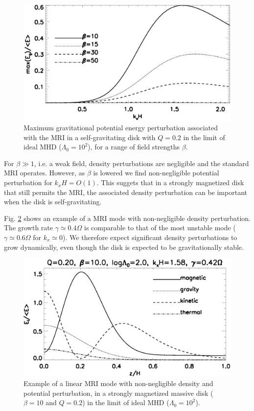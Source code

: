 \begin{figure}
  \includegraphics[width=\linewidth]{figures/compare_energy_ideal}
  \caption{Maximum gravitational potential energy perturbation
    associated with the MRI in a self-gravitating disk with $Q=0.2$ in
    the limit of ideal MHD ($\Lambda_0=10^2$), for a range of field
    strengths $\beta$.  
    \label{gravity_energy}}
\end{figure}

For $\beta\gg 1$, i.e. a weak field, density perturbations are
negligible and the standard MRI operates. However, as $\beta$ is
lowered we find non-negligible potential perturbation for
$k_xH=O(1)$. This suggets that in a strongly magnetized disk that
still permits the MRI, the associated density perturbation can be
important when the disk is self-gravitating. 

Fig. \ref{mri_massive} shows an example of a MRI mode with
non-negligible density perturbation. The growth rate $\gamma\simeq
0.4\Omega$ is comparable to that of the most unstable mode
($\gamma\simeq 0.6\Omega$ for $k_x\simeq0$). 
We therefore expect significant density perturbations to grow
dynamically, even though the disk is expected to be gravitationally
stable. 

 
\begin{figure}
  \includegraphics[width=\linewidth]{figures/result_ideal_sg}
  \caption{Example of a linear MRI mode with non-negligible density and
    potential perturbation, in a strongly magnetized massive disk
    ($\beta=10$ and $Q=0.2$) in the limit of ideal MHD 
    ($\Lambda_0=10^2$).   
    \label{mri_massive}}
\end{figure}


